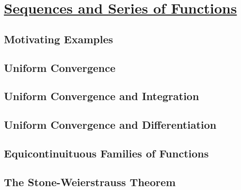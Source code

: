 \section[Sequences and Series of Functions]{\hyperlink{toc}{Sequences and Series of Functions}}

\subsection{Motivating Examples}

\subsection{Uniform Convergence}

\subsection{Uniform Convergence and Integration}

\subsection{Uniform Convergence and Differentiation}

\subsection{Equicontinuituous Families of Functions}

\subsection{The Stone-Weierstrauss Theorem}


